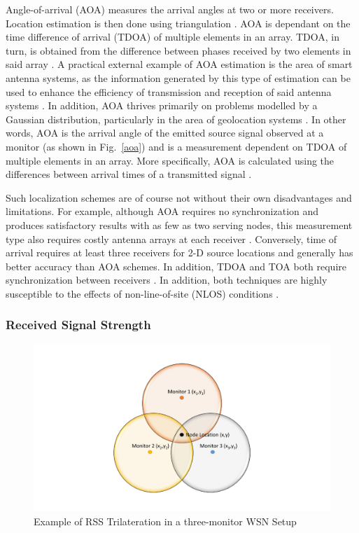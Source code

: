 \documentclass[12pt]{uthesis-v12}  %
\begin{document}
Angle-of-arrival (AOA) measures the arrival angles at two or more receivers. Location estimation is then done using triangulation \cite{peng,zhang5}. AOA is dependant on the time difference of arrival (TDOA) of multiple elements in an array. TDOA, in turn, is obtained from the difference between phases received by two elements in said array \cite{kumarasiri2}. A practical external example of AOA estimation is the area of smart antenna systems, as the information generated by this type of estimation can be used to enhance the efficiency of transmission and reception of said antenna systems \cite{lee}. In addition, AOA thrives primarily on problems modelled by a Gaussian distribution, particularly in the area of geolocation systems \cite{cheng}. In other words, AOA is the arrival angle of the emitted source signal observed at a monitor (as shown in Fig.~\ref{aoa}) and is a measurement dependent on TDOA of multiple elements in an array. More specifically, AOA is calculated using the differences between arrival times of a transmitted signal \cite{patwari}.

Such localization schemes are of course not without their own disadvantages and limitations. For example, although AOA requires no synchronization and produces satisfactory results with as few as two serving nodes, this measurement type also requires costly antenna arrays at each receiver \cite{kumarasiri2}. Conversely, time of arrival requires at least three receivers for 2-D source locations and generally has better accuracy than AOA schemes. In addition, TDOA and TOA both require synchronization between receivers \cite{kumarasiri2}. In addition, both techniques are highly susceptible to the effects of non-line-of-site (NLOS) conditions \cite{shen}.

\subsubsection{Received Signal Strength}

\begin{figure}[!t]
\centering
\includegraphics[width=5in]{rss}
\caption{Example of RSS Trilateration in a three-monitor WSN Setup}
\label{rss}
\end{figure}
\end{document}
